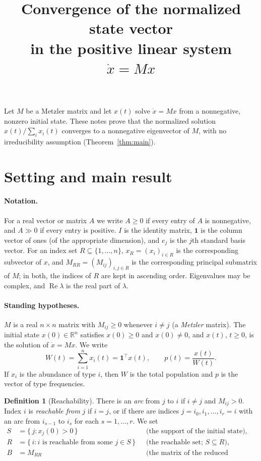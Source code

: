 \documentclass[11pt]{article}
\title{Convergence of the normalized state vector \\ in the positive linear system $\dot{x} = Mx$}
\author{}
\date{}
\theoremstyle{definition}
\newtheorem{definition}[theorem]{Definition}
\theoremstyle{remark}
\newcommand{\R}{\mathbb{R}}
\newcommand{\one}{\mathbf{1}}
\newcommand{\T}{\top}
\renewcommand{\Re}{\operatorname{Re}}
\begin{document}
\maketitle

\noindent
Let $M$ be a Metzler matrix and let $x(t)$ solve $\dot{x} = Mx$ from a nonnegative, nonzero
initial state. These notes prove that the normalized solution $x(t)/\sum_i x_i(t)$ converges to a
nonnegative eigenvector of $M$, with no irreducibility assumption
(Theorem~\ref{thm:main}).

\section{Setting and main result}\label{sec:setting}

\paragraph{Notation.}
For a real vector or matrix $A$ we write $A \ge 0$ if every entry of $A$ is nonnegative, and
$A \gg 0$ if every entry is positive. $I$ is the identity matrix, $\one$ is the column vector of
ones (of the appropriate dimension), and $e_j$ is the $j$th standard basis vector. For an index set $R \subseteq \{1,\dots,n\}$,
$x_R = (x_i)_{i \in R}$ is the corresponding subvector of $x$, and $M_{RR} = (M_{ij})_{i,j \in R}$
is the corresponding principal submatrix of $M$; in both, the indices of $R$ are kept in ascending
order. Eigenvalues may be complex, and $\Re\lambda$ is
the real part of $\lambda$.

\paragraph{Standing hypotheses.}
$M$ is a real $n \times n$ matrix with $M_{ij} \ge 0$ whenever $i \ne j$ (a \emph{Metzler} matrix).
The initial state $x(0) \in \R^n$ satisfies $x(0) \ge 0$ and $x(0) \ne 0$, and $x(t)$, $t \ge 0$,
is the solution of $\dot{x} = Mx$. We write
\[
  W(t) = \sum_{i=1}^n x_i(t) = \one^\T x(t),
  \qquad
  p(t) = \frac{x(t)}{W(t)} .
\]
If $x_i$ is the abundance of type $i$, then $W$ is the total population and $p$ is the vector of
type frequencies.

\begin{definition}[Reachability]\label{def:reach}
There is an \emph{arc} from $j$ to $i$ if $i \ne j$ and $M_{ij} > 0$. Index $i$ is
\emph{reachable from} $j$ if $i = j$, or if there are indices $j = i_0, i_1, \dots, i_r = i$ with
an arc from $i_{s-1}$ to $i_s$ for each $s = 1,\dots,r$. We set
\begin{align*}
  S &= \{\, j : x_j(0) > 0 \,\} && \text{(the support of the initial state),}\\
  R &= \{\, i : i \text{ is reachable from some } j \in S \,\} && \text{(the reachable set; } S \subseteq R\text{),}\\
  B &= M_{RR} && \text{(the matrix of the reduced system).}
\end{align*}
\end{definition}
\end{document}
